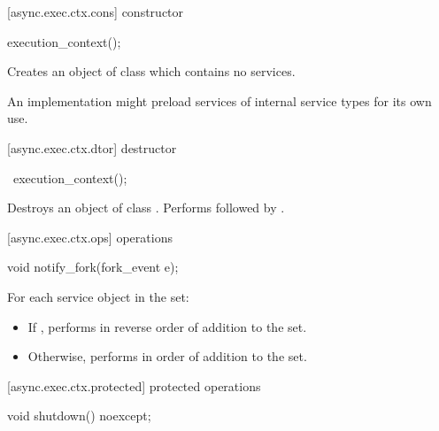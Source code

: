 [async.exec.ctx.cons]{ constructor}

\begin{itemdecl}
execution_context();
\end{itemdecl}

\begin{itemdescr}
\pnum
\effects Creates an object of class  which contains no services. \begin{note} An implementation might preload services of internal service types for its own use. \end{note}
\end{itemdescr}



[async.exec.ctx.dtor]{ destructor}

\begin{itemdecl}
~execution_context();
\end{itemdecl}

\begin{itemdescr}
\pnum
\effects Destroys an object of class . Performs  followed by .
\end{itemdescr}



[async.exec.ctx.ops]{ operations}

\begin{itemdecl}
void notify_fork(fork_event e);
\end{itemdecl}

\begin{itemdescr}
\pnum
\effects For each service object  in the set:
\begin{itemize}
\item
 If , performs  in reverse order of addition to the set.
\item
 Otherwise, performs  in order of addition to the set.
\end{itemize}
\end{itemdescr}



[async.exec.ctx.protected]{ protected operations}

\begin{itemdecl}
void shutdown() noexcept;
\end{itemdecl}

